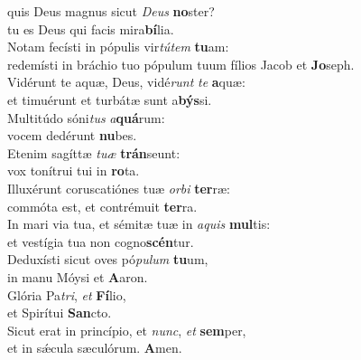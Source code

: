\oddverse  quis Deus magnus sicut \textit{De}\textit{us} \textbf{no}ster?~\*\\
\oddverse tu es Deus qui facis mira\textbf{bí}lia.\\
\evenverse Notam fecísti in pópulis vir\textit{tú}\textit{tem} \textbf{tu}am:~\*\\
\evenverse redemísti in bráchio tuo pópulum tuum fílios Jacob et \textbf{Jo}seph.\\
\oddverse Vidérunt te aquæ, Deus, vidé\textit{runt} \textit{te} \textbf{a}quæ:~\*\\
\oddverse et timuérunt et turbátæ sunt a\textbf{býs}si.\\
\evenverse Multitúdo sóni\textit{tus} \textit{a}\textbf{quá}rum:~\*\\
\evenverse vocem dedérunt \textbf{nu}bes.\\
\oddverse Etenim sagíttæ \textit{tu}\textit{æ} \textbf{trán}seunt:~\*\\
\oddverse vox tonítrui tui in \textbf{ro}ta.\\
\evenverse Illuxérunt coruscatiónes tuæ \textit{or}\textit{bi} \textbf{ter}ræ:~\*\\
\evenverse commóta est, et contrémuit \textbf{ter}ra.\\
\oddverse In mari via tua, et sémitæ tuæ in \textit{a}\textit{quis} \textbf{mul}tis:~\*\\
\oddverse et vestígia tua non cogno\textbf{scén}tur.\\
\evenverse Deduxísti sicut oves pó\textit{pu}\textit{lum} \textbf{tu}um,~\*\\
\evenverse in manu Móysi et \textbf{A}aron.\\
\oddverse Glória Pa\textit{tri}, \textit{et} \textbf{Fí}lio,~\*\\
\oddverse et Spirítui \textbf{San}cto.\\
\evenverse Sicut erat in princípio, et \textit{nunc}, \textit{et} \textbf{sem}per,~\*\\
\evenverse et in sǽcula sæculórum. \textbf{A}men.\\
